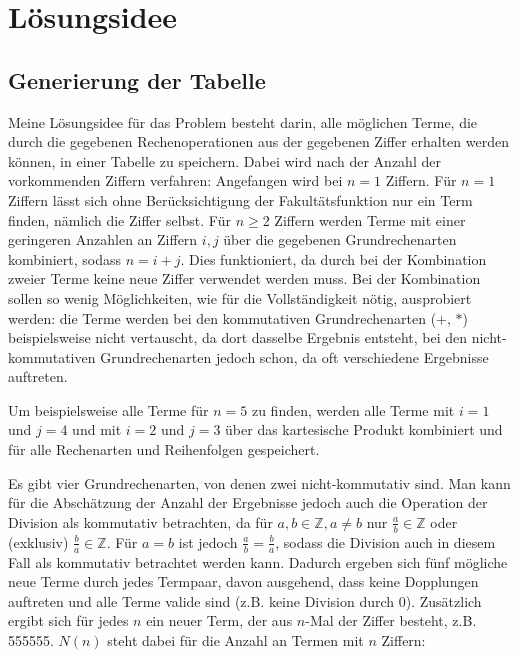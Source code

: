 \documentclass[a4paper,10pt,ngerman]{scrartcl}
\title{\Aufgabe}
\author{\Name\\Team-ID: \Einsendenummer}
\date{\today}
\begin{document}
\maketitle
\tableofcontents

\section{Lösungsidee}
\label{sec:idea}
\subsection{Generierung der Tabelle}
\label{sec:idea:generate}
Meine Lösungsidee für das Problem besteht darin, alle möglichen Terme, die durch die gegebenen Rechenoperationen aus der gegebenen Ziffer erhalten werden können, in einer Tabelle zu speichern.
Dabei wird nach der Anzahl der vorkommenden Ziffern verfahren:
Angefangen wird bei $n=1$ Ziffern.
Für $n=1$ Ziffern lässt sich ohne Berücksichtigung der Fakultätsfunktion nur ein Term finden, nämlich die Ziffer selbst.
Für $ n \geq 2$ Ziffern werden Terme mit einer geringeren Anzahlen an Ziffern $i,j$ über die gegebenen Grundrechenarten kombiniert, sodass $n=i+j$.
Dies funktioniert, da durch bei der Kombination zweier Terme keine neue Ziffer verwendet werden muss.
Bei der Kombination sollen so wenig Möglichkeiten, wie für die Vollständigkeit nötig, ausprobiert werden: die Terme werden bei den kommutativen Grundrechenarten ($+$, $*$) beispielsweise nicht vertauscht, da dort dasselbe Ergebnis entsteht, bei den nicht-kommutativen Grundrechenarten jedoch schon, da oft verschiedene Ergebnisse auftreten.

Um beispielsweise alle Terme für $n=5$ zu finden, werden alle Terme mit $i=1$ und $j=4$ und mit $i=2$ und $j=3$ über das kartesische Produkt kombiniert und für alle Rechenarten und Reihenfolgen gespeichert.

Es gibt vier Grundrechenarten, von denen zwei nicht-kommutativ sind.
Man kann für die Abschätzung der Anzahl der Ergebnisse jedoch auch die Operation der Division als kommutativ betrachten, da für $a,b \in \mathbb{Z}, a \neq b$ nur $\frac{a}{b} \in \mathbb{Z}$ oder (exklusiv) $\frac{b}{a} \in \mathbb{Z}$.
Für $a = b$ ist jedoch $\frac{a}{b} = \frac{b}{a}$, sodass die Division auch in diesem Fall als kommutativ betrachtet werden kann.
Dadurch ergeben sich fünf mögliche neue Terme durch jedes Termpaar, davon ausgehend, dass keine Dopplungen auftreten und alle Terme valide sind (z.B. keine Division durch 0).
Zusätzlich ergibt sich für jedes $n$ ein neuer Term, der aus $n$-Mal der Ziffer besteht, z.B. 555555.
$N(n)$ steht dabei für die Anzahl an Termen mit $n$ Ziffern:
\end{document}
